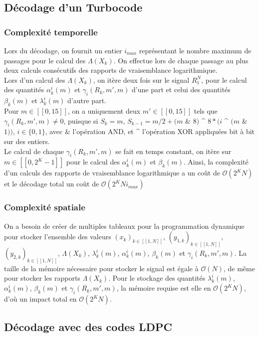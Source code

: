 \documentclass[12pt]{article}
\begin{document}
\subsection{D\'ecodage d'un Turbocode}
\subsubsection{Complexit\'e temporelle}
Lors du d\'ecodage, on fournit un entier $i_{max}$ repr\'esentant le nombre maximum de passages pour le calcul des $\Lambda(X_k)$. On effectue lors de chaque passage au plus deux calculs cons\'ecutifs des rapports de vraisemblance logarithmique.\\
Lors d'un calcul des $\Lambda(X_k)$, on it\`ere deux fois sur le signal $R_1^N$, pour le calcul des quantit\'es $\alpha_k^i(m)$ et $\gamma_i(R_k, m', m)$ d'une part et celui des quantit\'es $\beta_k(m)$ et $\lambda_k^i(m)$ d'autre part.\\
Pour $m \in [\![0, 15]\!]$, on a uniquement deux $m' \in [\![0, 15]\!]$ tels que $\gamma_i(R_k, m', m) \neq 0$, puisque si $S_k = m$, $S_{k-1} = m / 2 + (m$ \& $8)$ \^{} $8*(i$ \^{} $(m$ \& $1))$, $i \in \{0, 1\}$, avec \& l'op\'eration AND, et \^{} l'op\'eration XOR appliqu\'ees bit \`a bit sur des entiers.\\
Le calcul de chaque $\gamma_i(R_k, m', m)$ se fait en temps constant, on it\`ere sur $m\in[\![0, 2^K-1]\!]$ pour le calcul des $\alpha_k^i(m)$ et $\beta_k(m)$.
Ainsi, la complexit\'e d'un calculs des rapports de vraisemblance logarithmique a un co\^ut de $\mathcal{O}(2^KN)$ et le d\'ecodage total un co\^ut de $\mathcal{O}(2^KNi_{max})$


\subsubsection{Complexit\'e spatiale}
On a besoin de cr\'eer de multiples tableaux pour la programmation dynamique pour stocker l'ensemble des valeurs $(x_k)_{k \in [\![1, N]\!]}$, $(y_{1,k})_{k \in [\![1, N]\!]}$, $(y_{2,k})_{k \in [\![1, N]\!]}$, $\Lambda(X_k)$, $\lambda_k^i(m)$, $\alpha_k^i(m)$, $\beta_k(m)$ et $\gamma_i(R_k, m', m)$. La taille de la m\'emoire n\'ecessaire pour stocker le signal est \'egale \`a $\mathcal{O}(N)$, de m\^eme pour stocker les rapports $\Lambda(X_k)$. Pour le stockage des quantit\'es $\lambda_k^i(m)$, $\alpha_k^i(m)$, $\beta_k(m)$ et $\gamma_i(R_k, m', m)$, la m\'emoire requise est elle en $\mathcal{O}(2^KN)$,
d'o\`u un impact total en $\mathcal{O}(2^KN)$.


\subsection{D\'ecodage avec des codes LDPC}
\end{document}
